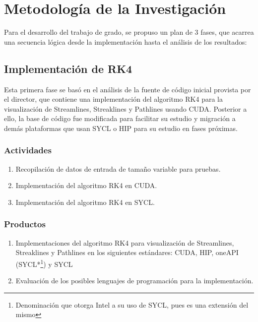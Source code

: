 \section{Metodología de la Investigación}

Para el desarrollo del trabajo de grado, se propuso un plan de 3 fases, que acarrea una secuencia lógica desde la implementación hasta el análisis de los resultados:


\subsection{Implementación de RK4}

Esta primera fase se basó en el análisis de la fuente de código inicial provista por el director, que contiene una implementación del algoritmo RK4 para la visualización de Streamlines, Streaklines y Pathlines usando CUDA. Posterior a ello, la base de código fue modificada para facilitar su estudio y migración a demás plataformas que usan SYCL o HIP para su estudio en fases próximas.

\subsubsection*{Actividades}

\begin{enumerate}
	\itemsep-2mm
	\item Recopilación de datos de entrada de tamaño variable para pruebas.
	\item Implementación del algoritmo RK4 en CUDA.
	\item Implementación del algoritmo RK4 en SYCL.
\end{enumerate}

\subsubsection*{Productos}

\begin{enumerate}
	\itemsep-2mm
	\item Implementaciones del algoritmo RK4 para visualización de Streamlines, Streaklines y Pathlines en los siguientes estándares: CUDA, HIP, oneAPI (SYCL*\footnote{Denominación que otorga Intel a su uso de SYCL, pues es una extensión del mismo}) y SYCL
	\item Evaluación de los posibles lenguajes de programación para la implementación.
\end{enumerate}

